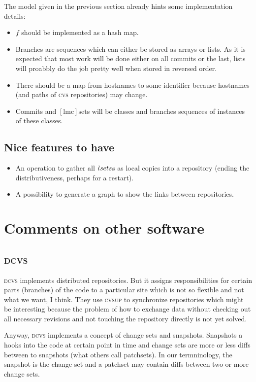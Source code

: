 \documentclass[fleqn, 10pt, a4paper]{article}
\begin{document}
The model given in the previous section already hints some implementation
details:

\begin{itemize}
\item $f$ should be implemented as a hash map.
\item Branches are sequences which can either be stored as
arrays or lists. As it is expected that most work will be done
either on all commits or the last, lists will proabbly do the job
pretty well when stored in reversed order.
\item There should be a map from hostnames to some identifier because
hostnames (and paths of \textsc{cvs} repositories) may change.
\item Commits and $\mathrm{[lmc]set}$s will be classes and
branches sequences of instances of these classes.
\end{itemize}

\subsection{Nice features to have}

\begin{itemize}
\item An operation to gather all $\mathnormal{lsets}$s as
local copies into a repository (ending the distributiveness, perhaps
for a restart).
\item A possibility to generate a graph to show the links between
repositories.
\end{itemize}

\section{Comments on other software}

\subsection{\textsc{dcvs}}

\textsc{dcvs} implements distributed repositories. But it assigns
responsibilities for certain parts (branches) of the code to
a particular site which is not so flexible and not what we want, I think.
They use \textsc{cvsup} to synchronize repositories which might be
interesting because the problem of how to exchange data without checking
out all necessary revisions and not touching the repository directly is
not yet solved.
 
Anyway, \textsc{dcvs} implements a concept of change sets and snapshots.
Snapshots a hooks into the code at certain point in time and change sets
are more or less diffs between to snapshots (what others call patchsets).
In our termninology, the snapshot is the change set and a patchset may
contain diffs between two or more change sets.
\end{document}
